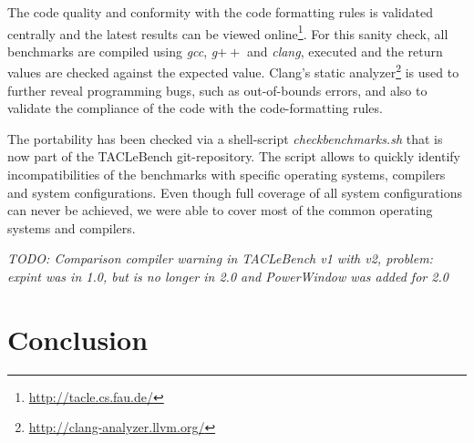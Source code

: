 \documentclass[a4paper,UKenglish]{oasics}
\newcommand{\todo}[1]{{\emph{TODO: #1}}}
\begin{document}
The code quality and conformity with the code formatting rules is validated centrally and the latest results can be viewed online\footnote{\url{http://tacle.cs.fau.de/}}.
For this sanity check, all benchmarks are compiled using \textit{gcc}, \textit{g$++$} and \textit{clang}, executed and the return values are checked against the expected value.
Clang's static analyzer\footnote{\url{http://clang-analyzer.llvm.org/}} is used to further reveal programming bugs, such as out-of-bounds errors, and also to validate the compliance of the code with the code-formatting rules.

The portability has been checked via a shell-script \textit{checkbenchmarks.sh} that is now part of the TACLeBench git-repository.
The script allows to quickly identify incompatibilities of the benchmarks with specific operating systems, compilers and system configurations.
Even though full coverage of all system configurations can never be achieved, we were able to cover most of the common operating systems and compilers.


\todo{Comparison compiler warning in TACLeBench v1 with v2, problem: expint was in 1.0, but is no
longer in 2.0 and PowerWindow was added for 2.0}

%


\section{Conclusion}
\label{sec:conclusion}
\end{document}
